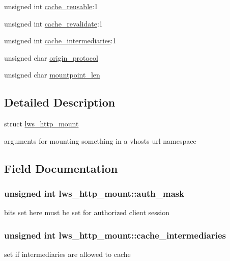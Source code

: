 \begin{DoxyCompactItemize}
\item 
unsigned int \hyperlink{structlws__http__mount_a8316dd183ffbef50419a5a4968d35d84}{cache\+\_\+reusable}\+:1
\item 
unsigned int \hyperlink{structlws__http__mount_ae137203040c6153694bd88a708da5395}{cache\+\_\+revalidate}\+:1
\item 
unsigned int \hyperlink{structlws__http__mount_aabec1a326780aafe11b977000983be0c}{cache\+\_\+intermediaries}\+:1
\item 
unsigned char \hyperlink{structlws__http__mount_a6a9b1492a0b9749e39bd19932717a0b7}{origin\+\_\+protocol}
\item 
unsigned char \hyperlink{structlws__http__mount_ac8489b60b8f969eb19c9abbdeac90743}{mountpoint\+\_\+len}
\end{DoxyCompactItemize}


\subsection{Detailed Description}
struct \hyperlink{structlws__http__mount}{lws\+\_\+http\+\_\+mount}

arguments for mounting something in a vhost\textquotesingle{}s url namespace 

\subsection{Field Documentation}
\subsubsection[{\texorpdfstring{auth\+\_\+mask}{auth\_mask}}]{\setlength{\rightskip}{0pt plus 5cm}unsigned int lws\+\_\+http\+\_\+mount\+::auth\+\_\+mask}\hypertarget{structlws__http__mount_a614364c770b0bd4db464ad65cddab477}{}\label{structlws__http__mount_a614364c770b0bd4db464ad65cddab477}
bits set here must be set for authorized client session 
\subsubsection[{\texorpdfstring{cache\+\_\+intermediaries}{cache\_intermediaries}}]{\setlength{\rightskip}{0pt plus 5cm}unsigned int lws\+\_\+http\+\_\+mount\+::cache\+\_\+intermediaries}\hypertarget{structlws__http__mount_aabec1a326780aafe11b977000983be0c}{}\label{structlws__http__mount_aabec1a326780aafe11b977000983be0c}
set if intermediaries are allowed to cache 
